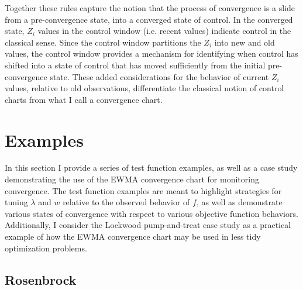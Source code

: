 \documentclass[12pt]{article}
\begin{document}
	Together these rules capture the notion that the process of convergence is a slide from a pre-convergence state, into a converged state of control. 
	In the converged state, $Z_i$ values in the control window (i.e. recent values) indicate control in the classical sense.
	Since the control window partitions the $Z_i$ into new and old values, the control window provides a mechanism for identifying when control has shifted into a state of control that has moved sufficiently from the initial pre-convergence state.
	These added considerations for the behavior of current $Z_i$ values, relative to old observations, differentiate the classical notion of control charts from what I call a convergence chart.  
	
	
%
%
\section{Examples}
%
%

In this section I provide a series of test function examples, as well as a case study demonstrating the use of the EWMA convergence chart for monitoring convergence.
The test function examples are meant to highlight strategies for tuning $\lambda$ and $w$ relative to the observed behavior of $f$, as well as demonstrate various states of convergence with respect to various objective function behaviors.
%
Additionally, I consider the Lockwood pump-and-treat case study as a practical example of how the EWMA convergence chart may be used in less tidy optimization problems.
	
	\clearpage
	\subsection{Rosenbrock}
	
\end{document}
